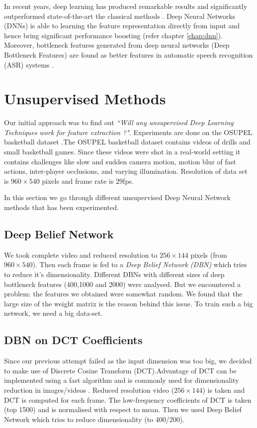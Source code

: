 In recent years, deep learning has produced remarkable results and significantly outperformed state-of-the-art the classical methods \cite{KarpathyCVPR14}. Deep Neural Networks (DNNs) is able to learning the feature representation directly from input and hence bring significant performance boosting (refer chapter \ref{chap:dnn}). Moreover, bottleneck features generated from deep neural networks (Deep Bottleneck Features) are found as better features in automatic speech recognition (ASR) systems \cite{yu2011improved,gehring2013extracting}.

\section{Unsupervised Methods}
\label{sec:event:unsupervised}
Our initial approach was to find out \textit{``Will any unsupervised Deep Learning Techniques work for feature extraction ?"}. Experiments are done on the OSUPEL basketball dataset \cite{brendel2011probabilistic}.The OSUPEL basketball dataset contains videos of drills and small basketball games. Since these videos were shot in a real-world setting it contains challenges like slow and sudden camera motion, motion blur of fast actions, inter-player occlusions, and varying illumination. Resolution of data set is $960 \times 540$ pixels and frame rate is $29$fps.

In this section we go through different unsupervised Deep Neural Network methods that has been experimented. 

\subsection{Deep Belief Network} 
We took complete video and reduced resolution to $256 \times 144$ pixels (from $960 \times 540$). Then each frame is fed to a \textit{Deep Belief Network (DBN)} which tries to reduce it's dimensionality. Different DBNs with different sizes of deep bottleneck features (400,1000 and 2000) were analysed. But we encountered a problem: the features we obtained were somewhat random. We found that the large size of the weight matrix is the reason behind this issue. To train such a big network, we need a big data-set.

\subsection{DBN on DCT Coefficients}
Since our previous attempt failed as the input dimension was too big, we decided to make use of Discrete Cosine Transform (DCT).Advantage of DCT can be implemented using a fast algorithm and is commonly used for dimensionality reduction in images/videos \cite{er2005high}. Reduced resolution video ($256 \times 144$) is taken and DCT is computed for each frame. The low-frequency coefficients of DCT is taken (top 1500) and is normalised with respect to mean. Then we used Deep Belief Network which tries to reduce dimensionality (to 400/200).

